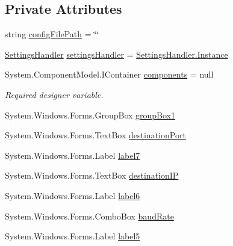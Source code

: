 \subsection*{Private Attributes}
\begin{DoxyCompactItemize}
\item 
string \mbox{\hyperlink{class_cert_complete_1_1_p_a_x___settings___form_ae9e9f23bde388716bca04462ee747870}{config\+File\+Path}} = \char`\"{}\char`\"{}
\item 
\mbox{\hyperlink{class_cert_complete_1_1_settings_handler}{Settings\+Handler}} \mbox{\hyperlink{class_cert_complete_1_1_p_a_x___settings___form_a67367c67b272ddd35f81ac826dad92dc}{settings\+Handler}} = \mbox{\hyperlink{class_cert_complete_1_1_settings_handler_a7c4f8eb33b1113986d52942f93e52da8}{Settings\+Handler.\+Instance}}
\item 
System.\+Component\+Model.\+I\+Container \mbox{\hyperlink{class_cert_complete_1_1_p_a_x___settings___form_a4fb512a3b7ce303b2ca43a174ac78a6c}{components}} = null
\begin{DoxyCompactList}\small\item\em Required designer variable. \end{DoxyCompactList}\item 
System.\+Windows.\+Forms.\+Group\+Box \mbox{\hyperlink{class_cert_complete_1_1_p_a_x___settings___form_a318556a6d504db77d24ba6afd95d5d92}{group\+Box1}}
\item 
System.\+Windows.\+Forms.\+Text\+Box \mbox{\hyperlink{class_cert_complete_1_1_p_a_x___settings___form_aecdd3cb25acd749b1b3a7f85fff6911a}{destination\+Port}}
\item 
System.\+Windows.\+Forms.\+Label \mbox{\hyperlink{class_cert_complete_1_1_p_a_x___settings___form_a61dd2a7f5cf162a5e9f8ff6e97f821de}{label7}}
\item 
System.\+Windows.\+Forms.\+Text\+Box \mbox{\hyperlink{class_cert_complete_1_1_p_a_x___settings___form_a3b1bf2793d1935e7c4a713607fce312e}{destination\+IP}}
\item 
System.\+Windows.\+Forms.\+Label \mbox{\hyperlink{class_cert_complete_1_1_p_a_x___settings___form_afae42606a9b52f1ae1cdfd26f163169a}{label6}}
\item 
System.\+Windows.\+Forms.\+Combo\+Box \mbox{\hyperlink{class_cert_complete_1_1_p_a_x___settings___form_a236f78b7e2e02dfd92ed04b287431c83}{baud\+Rate}}
\item 
System.\+Windows.\+Forms.\+Label \mbox{\hyperlink{class_cert_complete_1_1_p_a_x___settings___form_a6019051165a7aa601679b78dd62e5d9d}{label5}}

\end{DoxyCompactItemize}
